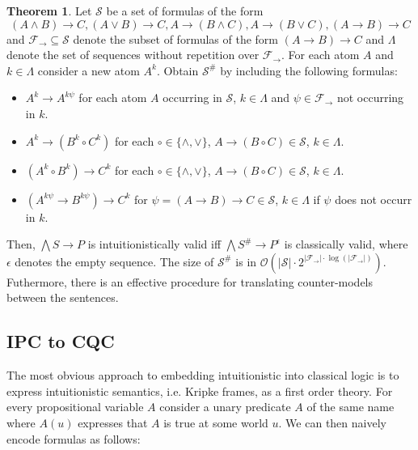 \documentclass[a4paper,12pt]{report}
\theoremstyle{definition}
\newtheorem{theorem}{Theorem}[section]
\theoremstyle{definition}
\theoremstyle{definition}
\theoremstyle{definition}
\theoremstyle{definition}
\theoremstyle{definition}
\theoremstyle{definition}
\begin{document}
	\begin{theorem}
		Let $\mathcal S$ be a set of formulas of the form
		$$(A\wedge B)\to C, (A\vee B)\to C, A\to (B\wedge C), A\to(B\vee C), (A\to B)\to C$$
		and $\mathcal F_\to\subseteq\mathcal S$ denote the subset of formulas of the form $(A\to B)\to C$ and $\Lambda$ denote the set of sequences without repetition over $\mathcal F_\to$. For each atom $A$ and $k\in\Lambda$ consider a new atom $A^k$. Obtain $\mathcal S^\#$ by including the following formulas:
		\begin{itemize}
			\item $A^k\to A^{k\psi}$ for each atom $A$ occurring in $\mathcal S$, $k\in\Lambda$ and $\psi\in\mathcal F_\to$ not occurring in $k$.
			\item $A^k\to (B^k\circ C^k)$ for each $\circ\in\{\wedge,\vee\}$, $A\to (B\circ C)\in\mathcal S$, $k\in\Lambda$.
			\item $(A^k\circ B^k)\to C^k$ for each $\circ\in\{\wedge,\vee\}$, $A\to (B\circ C)\in\mathcal S$, $k\in\Lambda$.
			\item $(A^{k\psi}\to B^{k\psi})\to C^k$ for $\psi = (A\to B)\to C\in\mathcal S$, $k\in\Lambda$ if $\psi$ does not occurr in $k$.
		\end{itemize}
		Then, $\bigwedge S\to P$ is intuitionistically valid iff $\bigwedge S^\#\to P^\epsilon$ is classically valid, where $\epsilon$ denotes the empty sequence. The size of $\mathcal S^\#$ is in $\mathcal O(|\mathcal S|\cdot2^{|\mathcal F_\to|\cdot\log(|\mathcal F_\to|)})$. Futhermore, there is an effective procedure for translating counter-models between the sentences.
	\end{theorem}
	
	\subsection{IPC to CQC}
	
	The most obvious approach to embedding intuitionistic into classical logic is to express intuitionistic semantics, i.e. Kripke frames, as a first order theory. For every propositional variable $A$ consider a unary predicate $A$ of the same name where $A(u)$ expresses that $A$ is true at some world $u$. We can then naively encode formulas as follows:
	
\end{document}

